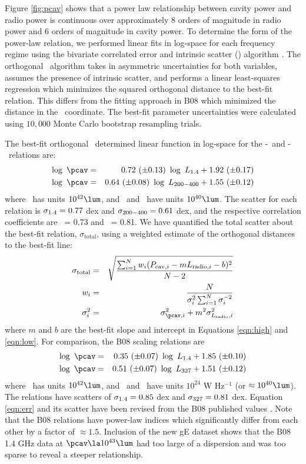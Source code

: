 \documentclass{emulateapj}
\begin{document}
Figure \ref{fig:pcav} shows that a power law relationship between
cavity power and radio power is continuous over approximately 8 orders
of magnitude in radio power and 6 orders of magnitude in cavity
power. To determine the form of the power-law relation, we performed
linear fits in log-space for each frequency regime using the bivariate
correlated error and intrinsic scatter (\bces) algorithm
\citep{bces}. The orthogonal \bces\ algorithm takes in asymmetric
uncertainties for both variables, assumes the presence of intrinsic
scatter, and performs a linear least-squares regression which
minimizes the squared orthogonal distance to the best-fit
relation. This differs from the fitting approach in B08 which
minimized the distance in the \pcav\ coordinate. The best-fit
parameter uncertainties were calculated using $10,000$ Monte Carlo
bootstrap resampling trials.

The best-fit orthogonal \bces\ determined linear function in log-space
for the \pcav-\phigh\ and \pcav-\plow\ relations are:
\begin{eqnarray}
  \log~\pcav &=& 0.72~(\pm 0.13)~\log~\phigh + 1.92~(\pm 0.17) \label{eqn:high}\\
  \log~\pcav &=& 0.64~(\pm 0.08)~\log~\plow + 1.55~(\pm 0.12) \label{eqn:low}
\end{eqnarray}
where \pcav\ has units $10^{42} \lum$, and \phigh\ and \plow\ have
units $10^{40} \lum$. The scatter for each relation is $\sigma_{\mathrm{1.4}} = 0.77$
dex and $\sigma_{\mathrm{200-400}} = 0.61$ dex, and the respective correlation
coefficients are \rhigh\ = 0.73 and \rlow\ = 0.81. We have quantified
the total scatter about the best-fit relation,
$\sigma_{\mathrm{total}}$, using a weighted estimate of the orthogonal
distances to the best-fit line:
\begin{eqnarray}
  \sigma_{\mathrm{total}} &=& \sqrt{\frac{\sum_{i=1}^N w_i (P_{\mathrm{cav},i}-m L_{\mathrm{radio},i}-b)^2}{N-2}} \nonumber \\
  w_i &=& \frac{N}{\sigma_i^2 \sum_{i=1}^N \sigma_i^{-2}} \nonumber \\
  \sigma_i^2 &=& \sigma_{\pcav,i}^2 + m^2 \sigma_{\prad,i}^2 \nonumber
\end{eqnarray}
where $m$ and $b$ are the best-fit slope and intercept in Equations
\ref{eqn:high} and \ref{eqn:low}. For comparison, the B08 scaling
relations are
\begin{eqnarray}
  \log~\pcav &=& 0.35~(\pm 0.07)~\log~\phigh + 1.85~(\pm 0.10) \label{eqn:err}\\
  \log~\pcav &=& 0.51~(\pm 0.07)~\log~\pthree + 1.51~(\pm 0.12)
\end{eqnarray}
where \pcav\ has units $10^{42} \lum$, and \phigh\ and \pthree\ have
units $10^{24}$ W Hz$^{-1}$ (or $\approx 10^{40} \lum$). The relations
have scatters of $\sigma_{\mathrm{1.4}} = 0.85$ dex and $\sigma_{\mathrm{327}} = 0.81$
dex. Equation \ref{eqn:err} and its scatter have been revised from the
B08 published values \citep{birzan08err}. Note that the B08 relations
have power-law indices which significantly differ from each other by a
factor of $\approx 1.5$. Inclusion of the new gE dataset shows that
the B08 1.4 GHz data at $\pcav \la 10^{43} \lum$ had too large of a
dispersion and was too sparse to reveal a steeper relationship.
\end{document}
